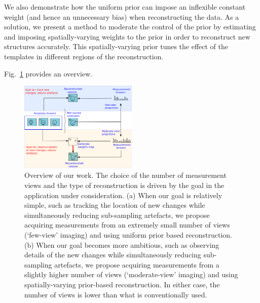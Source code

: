 \documentclass[journal]{IEEEtran}
\begin{document}

We also demonstrate how the uniform prior can impose an inflexible
constant weight (and hence an unnecessary bias) when reconstructing
the data. As a solution, we present a method to moderate the control
of the prior by estimating and imposing spatially-varying weights to
the prior in order to reconstruct new structures accurately. This
spatially-varying prior tunes the effect of the templates in different
regions of the reconstruction.

Fig.~\ref{fig:prior_overview} provides an overview.


 \begin{figure}[h]
\centering
	\includegraphics[width=0.5\textwidth]{../images/prior_cmb.png}
        \caption{Overview of our work. The choice of the number of
          measurement views and the type of reconstruction is driven
          by the goal in the application under consideration.  (a) When
          our goal is relatively simple, such as tracking the location
          of new changes while simultaneously reducing sub-sampling
          artefacts, we propose acquiring measurements from an
          extremely small number of views (`few-view' imaging) and
          using uniform prior based reconstruction. (b) When our goal
          becomes more ambitious, such as observing details of the new
          changes while simultaneously reducing sub-sampling
          artefacts, we propose acquiring measurements from a
          slightly higher number of views (`moderate-view' imaging)
          and using spatially-varying prior-based reconstruction. In
          either case, the number of views is lower than what is
          conventionally used.}
 \label{fig:prior_overview}
\end{figure}
\end{document}
